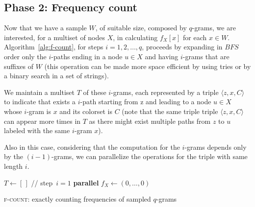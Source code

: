 \clearpage
\subsection*{Phase 2: Frequency count}

Now that we have a sample $W$, of suitable size, composed by $q$-grams, we are interested, for a multiset of nodes $X$, in calculating $f_{X}[x]$ for each $x \in W$. Algorithm~\ref{alg:f-count}, for steps $i = 1, 2, \ldots, q$, proceeds by expanding in $BFS$ order only the $i$-paths ending in a node $u \in X$ and having $i$-grams that are suffixes of $W$ (this operation can be made more space efficient by using tries or by a binary search in a set of strings).\medskip

We maintain a multiset $T$ of these $i$-grams, each represented by a triple $\langle z, x, C \rangle$ to indicate that exists a $i$-path starting from z and leading to a node $u \in X$ whose $i$-gram is $x$ and its colorset is $C$ (note that the same triple triple $\langle z, x, C \rangle$ can appear more times in $T$ as there might exist multiple paths from $z$ to $u$ labeled with the same $i$-gram $x$).\medskip

Also in this case, considering that the computation for the $i$-grams depends only by the $(i-1)$-grams, we can parallelize the operations for the triple with same length $i$.

\begin{algorithm}[h]
	
	\small
	\DontPrintSemicolon
	\BlankLine
	$T\gets[\,]$ \quad // step~$i=1$\; 
	\BlankLine
	\textbf{parallel} 
	\BlankLine
	\BlankLine
	$f_X \gets (0,\ldots,0)$\;
	\BlankLine
	\BlankLine
	\caption{\textsc{f-count}: exactly counting frequencies of sampled $q$-grams}
	\label{alg:f-count}
\end{algorithm}

